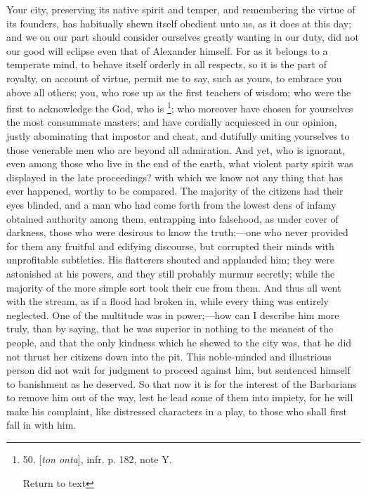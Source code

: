 Your city, preserving its native spirit and temper, and remembering the
virtue of its founders, has habitually shewn itself obedient unto us,
as it does at this day; and we on our part should consider ourselves
greatly wanting in our duty, did not our good will eclipse even that
of Alexander himself. For as it belongs to a temperate mind, to behave
itself orderly in all respects, so it is the part of royalty, on
account of virtue, permit me to say, such as yours, to embrace you
above all others; you, who rose up as the first teachers of wisdom;
who were the first to acknowledge the God, who is \footnote{50. [\emph{ton
onta}], infr. p. 182, note Y.

Return to text}; who moreover have chosen for yourselves the most consummate
masters; and have cordially acquiesced in our opinion, justly
abominating that impostor and cheat, and dutifully uniting yourselves
to those venerable men who are beyond all admiration. And yet, who is
ignorant, even among those who live in the end of the earth, what
violent party spirit was displayed in the late proceedings? with which
we know not any thing that has ever happened, worthy to be compared.
The majority of the citizens had their eyes blinded, and a man who had
come forth from the lowest dens of infamy obtained authority among
them, entrapping into falsehood, as under cover of darkness, those who
were desirous to know the truth;—one who never provided for them any
fruitful and edifying discourse, but corrupted their minds with
unprofitable subtleties. His flatterers shouted and applauded him;
they were astonished at his powers, and they still probably murmur
secretly; while the majority of the more simple sort took their cue
from them. And thus all went with the stream, as if a flood had
broken in, while every thing was entirely neglected. One of the
multitude was in power;—how can I describe him more truly, than by
saying, that he was superior in nothing to the meanest of the people,
and that the only kindness which he shewed to the city was, that he
did not thrust her citizens down into the pit. This noble-minded and
illustrious person did not wait for judgment to proceed against him,
but sentenced himself to banishment as he deserved. So that now it is
for the interest of the Barbarians to remove him out of the way, lest
he lead some of them into impiety, for he will make his complaint,
like distressed characters in a play, to those who shall first fall in
with him.

